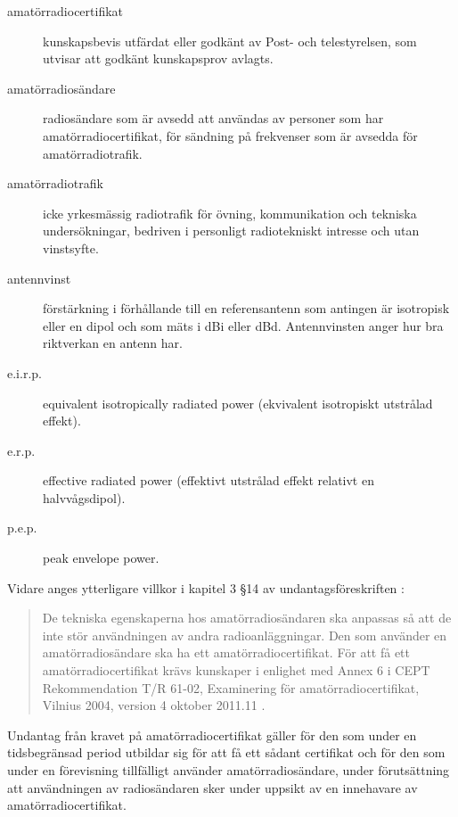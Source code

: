 \newpage %
\begin{description}
\item[amatörradiocertifikat] kunskapsbevis utfärdat eller godkänt av
Post- och telestyrelsen, som utvisar att godkänt kunskapsprov avlagts.

\item[amatörradiosändare] radiosändare som är avsedd att användas av personer
som har amatörradiocertifikat, för sändning på frekvenser som är avsedda för
amatörradiotrafik.

\item[amatörradiotrafik] icke yrkesmässig radiotrafik för övning,
kommunikation och tekniska undersökningar, bedriven i personligt radiotekniskt
intresse och utan vinstsyfte.

\item[antennvinst] förstärkning i förhållande till en referensantenn som
antingen är isotropisk eller en dipol och som mäts i dBi eller dBd.
Antennvinsten anger hur bra riktverkan en antenn har.

\item[e.i.r.p.] equivalent isotropically radiated power (ekvivalent
isotropiskt utstrålad effekt).

\item[e.r.p.] effective radiated power (effektivt utstrålad effekt relativt en
halvvågsdipol).

\item[p.e.p.] peak envelope power.
\end{description}
Vidare anges ytterligare villkor i kapitel 3 \S 14 av undantagsföreskriften
\cite{PTSFS2020:5}:
\begin{quote}
De tekniska egenskaperna hos amatörradiosändaren ska anpassas så att de inte
stör användningen av andra radioanläggningar.
Den som använder en amatörradiosändare ska ha ett amatörradiocertifikat.
För att få ett amatörradiocertifikat krävs kunskaper i enlighet med Annex 6 i
CEPT Rekommendation T/R 61-02, Examinering för amatörradiocertifikat,
Vilnius 2004, version 4 oktober 2011.11 \cite{TR6102}.
\end{quote}
Undantag från kravet på amatörradiocertifikat gäller för den som under en
tidsbegränsad period utbildar sig för att få ett sådant certifikat och för den
som under en förevisning tillfälligt använder amatörradiosändare, under
förutsättning att användningen av radiosändaren sker under uppsikt av en
innehavare av amatörradiocertifikat.

